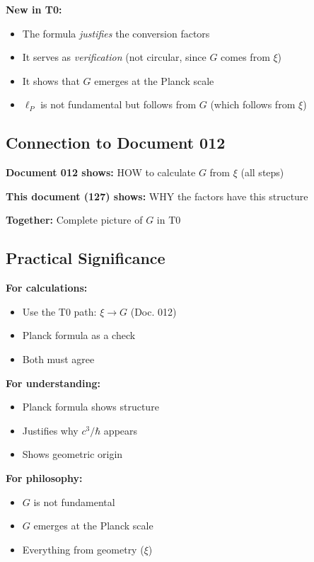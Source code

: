 	\textbf{New in T0:}
	\begin{itemize}
		\item The formula \textit{justifies} the conversion factors
		\item It serves as \textit{verification} (not circular, since $G$ comes from $\xi$)
		\item It shows that $G$ emerges at the Planck scale
		\item $\ell_P$ is not fundamental but follows from $G$ (which follows from $\xi$)
	\end{itemize}
	
	\subsection{Connection to Document 012}
	
	\textbf{Document 012 shows:} HOW to calculate $G$ from $\xi$ (all steps)
	
	\textbf{This document (127) shows:} WHY the factors have this structure
	
	\textbf{Together:} Complete picture of $G$ in T0
	
	\subsection{Practical Significance}
	
	\textbf{For calculations:}
	\begin{itemize}
		\item Use the T0 path: $\xi \to G$ (Doc. 012)
		\item Planck formula as a check
		\item Both must agree
	\end{itemize}
	
	\textbf{For understanding:}
	\begin{itemize}
		\item Planck formula shows structure
		\item Justifies why $c^3/\hbar$ appears
		\item Shows geometric origin
	\end{itemize}
	
	\textbf{For philosophy:}
	\begin{itemize}
		\item $G$ is not fundamental
		\item $G$ emerges at the Planck scale
		\item Everything from geometry ($\xi$)
	\end{itemize}
	